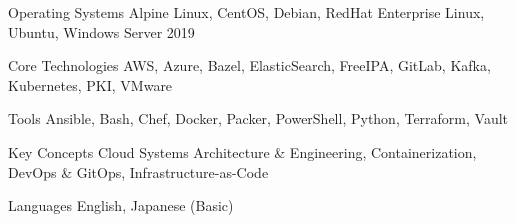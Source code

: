 \begin{cvskills}


\cvskill
{Operating Systems} %
{ %
 Alpine Linux,
 CentOS,
 Debian,
 RedHat Enterprise Linux,
 Ubuntu,
 Windows Server 2019
}


\cvskill
{Core Technologies} %
{ %
 AWS,
 Azure,
 Bazel,
 ElasticSearch,
 FreeIPA,
 GitLab,
 Kafka,
 Kubernetes,
 PKI,
 VMware
}


\cvskill
{Tools} %
{ %
 Ansible,
 Bash,
 Chef,
 Docker,
 Packer,
 PowerShell,
 Python,
 Terraform,
 Vault
}


\cvskill
{Key Concepts} %
{ %
 Cloud Systems Architecture \& Engineering,
 Containerization,
 DevOps \& GitOps,
 Infrastructure-as-Code
}



\cvskill
{Languages} %
{English, Japanese (Basic)} %


\end{cvskills}
